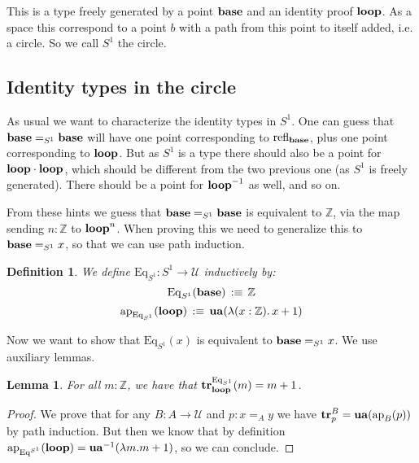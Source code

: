 \documentclass{article}
\newcommand{\sse}[1]{\medbreak \subsection{#1}}
\newcommand{\U}{{\mathcal U}}
\renewcommand{\r}{\rightarrow}
\newcommand{\Gl}{\lambda}
\newcommand{\ap}{\mathrm{ap}}
\newcommand{\refl}{\mathrm{refl}}
\newcommand{\tr}{\mathrm{\bf tr}}
\newcommand{\ua}{\mathrm{\bf ua}}
\newcommand{\base}{\mathrm{\bf base}}
\renewcommand{\loop}{\mathrm{\bf loop}}
\newcommand{\Eq}{\mathrm{Eq}}
\newtheorem{lemma}{Lemma}
\newtheorem{definition}{Definition}
\begin{document}
This is a type freely generated by a point $\base$ and an identity proof $\loop$. As a space this correspond to a point $b$ with a path from this point to itself added, i.e. a circle. So we call $S^1$ the circle. 

\sse{Identity types in the circle}

As usual we want to characterize the identity types in $S^1$. One can guess that $\base=_{S^1}\base$ will have one point corresponding to $\refl_\base$, plus one point corresponding to $\loop$. But as $S^1$ is a type there should also be a point for $\loop\cdot\loop$, which should be different from the two previous one (as $S^1$ is freely generated). There should be a point for $\loop^{-1}$ as well, and so on.

From these hints we guess that $\base=_{S^1}\base$ is equivalent to $\mathbb{Z}$, via the map sending $n:\mathbb{Z}$ to $\loop^n$. When proving this we need to generalize this to $\base=_{S^1}x$, so that we can use path induction.

\begin{definition}
We define $\Eq_{S^1} : S^1 \r \U$ inductively by:
\[\Eq_{S^1}(\base) \, :\equiv\, \mathbb{Z}\]
\[\ap_{\Eq_{S^1}}(\loop) \, :\equiv\, \ua(\Gl(x:\mathbb{Z}).\, x+1)\] %
\end{definition} 

Now we want to show that $\Eq_{S^1}(x)$ is equivalent to $\base=_{S^1}x$. We use auxiliary lemmas.


\begin{lemma}
For all $m:\mathbb{Z}$, we have that $\tr_\loop^{\Eq_{S^1}}(m) = m+1$.
\end{lemma}
\begin{proof}
We prove that for any $B:A\r \U$ and $p:x=_Ay$ we have $\tr^B_p = \ua(\ap_B(p))$ by path induction. But then we know that by definition $\ap_{\Eq^{S^1}}(\loop) = \ua^{-1}(\Gl m.m+1)$, so we can conclude.
\end{proof}
\end{document}
